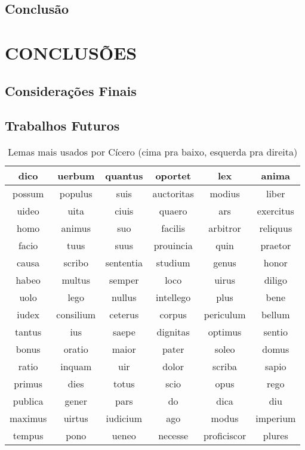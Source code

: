 \documentclass[pnumromarab, normaltoc, a4paper, 12pt]{abnt-unochapeco}
\begin{document}
\section{Conclusão}
\chapter{CONCLUSÕES}
\section{Considerações Finais}
\section{Trabalhos Futuros}

\begin{table}[ht]
\caption{Lemas mais usados por Cícero (cima pra baixo, esquerda pra direita)}
\begin{center}
\begin{tabular}{|c|c|c|c|c|c|}
\hline
dico & uerbum & quantus & oportet & lex & anima \\ \hline
possum & populus & suis & auctoritas & modius & liber \\ \hline
uideo & uita & ciuis & quaero & ars & exercitus \\ \hline
homo & animus & suo & facilis & arbitror & reliquus \\ \hline
facio & tuus & suus & prouincia & quin & praetor \\ \hline
causa & scribo & sententia & studium & genus & honor \\ \hline
habeo & multus & semper & loco & uirus & diligo \\ \hline
uolo & lego & nullus & intellego & plus & bene \\ \hline
iudex & consilium & ceterus & corpus & periculum & bellum \\ \hline
tantus & ius & saepe & dignitas & optimus & sentio \\ \hline
bonus & oratio & maior & pater & soleo & domus \\ \hline
ratio & inquam & uir & dolor & scriba & sapio \\ \hline
primus & dies & totus & scio & opus & rego \\ \hline
publica & gener & pars & do & dica & diu \\ \hline
maximus & uirtus & iudicium & ago & modus & imperium \\ \hline
tempus & pono & ueneo & necesse & proficiscor & plures \\ \hline

\end{tabular}
\end{center}
\end{table}
\end{document}
